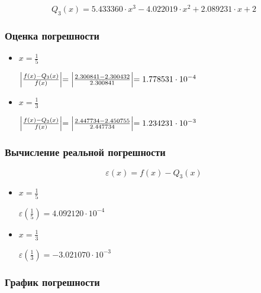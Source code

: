 \begin{displaymath}
Q_3(x) = 5.433360 \cdot x^3 - 4.022019 \cdot x^2 + 2.089231 \cdot x+2
\end{displaymath}

\subsubsection{Оценка погрешности}

\begin{itemize}

\item $x = \frac{1}{5}$

$\Bigl | \frac{f(x) - Q_3(x)}{f(x)} \Bigl | = \Bigl | \frac{2.300841 - 2.300432}{2.300841} \Bigl | = 1.778531 \cdot 10^{-4}$

\item $x = \frac{1}{3}$

$\Bigl | \frac{f(x) - Q_3(x)}{f(x)} \Bigl | = \Bigl | \frac{2.447734 - 2.450755}{2.447734} \Bigl | = 1.234231 \cdot 10^{-3}$

\end{itemize}

\subsubsection{Вычисление реальной погрешности}

\begin{displaymath}
\varepsilon(x) = f(x) - Q_3(x)
\end{displaymath}

\begin{itemize}

\item $x = \frac{1}{5}$

$\varepsilon(\frac{1}{5}) = 4.092120 \cdot 10^{-4}$

\item $x = \frac{1}{3}$

$\varepsilon(\frac{1}{3}) = -3.021070 \cdot 10^{-3}$

\end{itemize}

\subsubsection{График погрешности}

